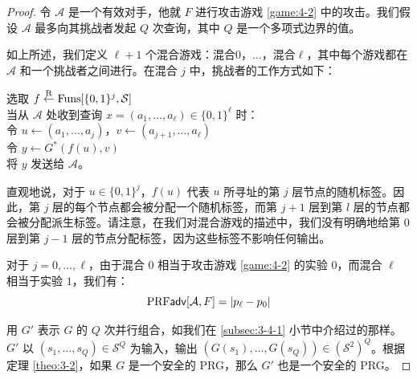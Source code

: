 \begin{proof}
令 $\mathcal{A}$ 是一个有效对手，他就 $F$ 进行攻击游戏 \ref{game:4-2} 中的攻击。我们假设 $\mathcal{A}$ 最多向其挑战者发起 $Q$ 次查询，其中 $Q$ 是一个多项式边界的值。

如上所述，我们定义 $\ell+1$ 个混合游戏：混合$0$，$\dots$，混合$\ell$，其中每个游戏都在 $\mathcal{A}$ 和一个挑战者之间进行。在混合 $j$ 中，挑战者的工作方式如下：

\vspace{5pt}

\hspace*{5pt} 选取 $f\overset{\rm R}\leftarrow{\rm Funs}[\{0,1\}^j,\mathcal{S}]$\\
\hspace*{26pt} 当从 $\mathcal{A}$ 处收到查询 $x=(a_1,\dots,a_\ell)\in\{0,1\}^\ell$ 时：\\
\hspace*{50pt} 令 $u\leftarrow(a_1,\dots,a_j)$，$v\leftarrow(a_{j+1},\dots,a_\ell)$\\
\hspace*{50pt} 令 $y\leftarrow G^*(f(u),v)$\\
\hspace*{50pt} 将 $y$ 发送给 $\mathcal{A}$。

\vspace{5pt}

\noindent
直观地说，对于 $u\in\{0,1\}^j$，$f(u)$ 代表 $u$ 所寻址的第 $j$ 层节点的随机标签。因此，第 $j$ 层的每个节点都会被分配一个随机标签，而第 $j+1$ 层到第 $l$ 层的节点都会被分配派生标签。请注意，在我们对混合游戏的描述中，我们没有明确地给第 $0$ 层到第 $j-1$ 层的节点分配标签，因为这些标签不影响任何输出。

对于 $j=0,\dots,\ell$，由于混合 $0$ 相当于攻击游戏 \ref{game:4-2} 的实验 $0$，而混合 $\ell$ 相当于实验 $1$，我们有：
\begin{equation}\label{eq:4-30}
{\rm PRF\mathsf{adv}}[\mathcal{A},F]=|p_\ell-p_0|
\end{equation}

用 $G'$ 表示 $G$ 的 $Q$ 次并行组合，如我们在 \ref{subsec:3-4-1} 小节中介绍过的那样。$G'$ 以 $(s_1,\dots,s_Q)\in\mathcal{S}^Q$ 为输入，输出 $(G(s_1),\dots,G(s_Q))\in(\mathcal{S}^2)^Q$。根据定理 \ref{theo:3-2}，如果 $G$ 是一个安全的 PRG，那么 $G'$ 也是一个安全的 PRG。


\end{proof}
